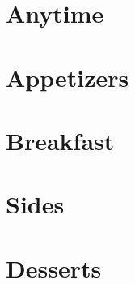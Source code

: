 \documentclass{book}
\begin{document}
\tableofcontents
\chapter{Anytime}



\chapter{Appetizers}


\chapter{Breakfast}

\chapter{Sides}

\chapter{Desserts}



\end{document}
